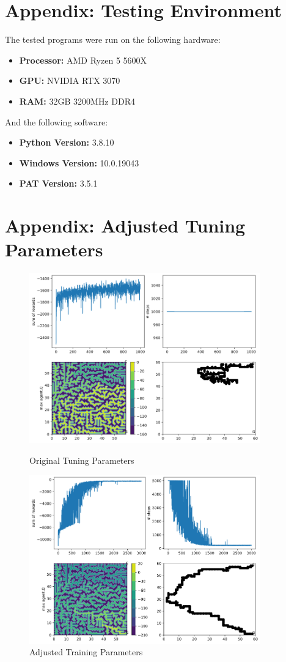 \documentclass[twoside, 12pt, a4paper]{article}
\begin{document}
\newpage

\section {Appendix: Testing Environment} \label{appendix:environment}
The tested programs were run on the following hardware: 
\begin{itemize}
\item \textbf{Processor:} AMD Ryzen 5 5600X 
\item \textbf{GPU:} NVIDIA RTX 3070 
\item \textbf{RAM:} 32GB 3200MHz DDR4
\end{itemize}
And the following software:
\begin{itemize}
\item \textbf{Python Version:} 3.8.10
\item \textbf{Windows Version:} 10.0.19043
\item \textbf{PAT Version:} 3.5.1
\end{itemize}

\newpage

\section {Appendix: Adjusted Tuning Parameters} \label{appendix:Tuning}
\begin{figure}[ht]
\begin{center}
\includegraphics[width=10cm]{UntunedTraining.png}
\caption{\label{tab:table-name}Original Tuning Parameters}

\includegraphics[width=10cm]{TunedTraining.png} 
\caption{\label{tab:table-name}Adjusted Training Parameters}
\end {center}
\end{figure}
\end{document}
